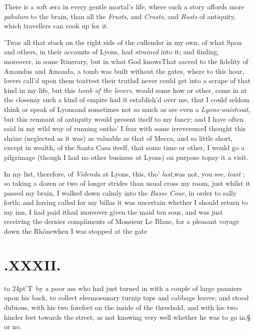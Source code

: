 \documentclass{article}
\begin{document}
There is a soft æra in every gentle mortal’s life,
where such a story affords more \textit{pabulum} to the brain, than
all the \textit{Frusts}, and \textit{Crusts}, and \textit{Rusts} of
antiquity, which travellers can cook up for it.

\tsh ’Twas all that stuck on the right\break
side of the cullender in my own, of what Spon
and others, in their accounts of Lyons, had \textit{strained} into it; and finding,
moreover, in some Itinerary, but in what God knows\tsk That sacred to the fidelity
of Amandus and Amanda, a tomb was built without the gates, where to this hour,
lovers call’d upon them to\pb attest their truths\tsk I never could get into a scrape
of that kind in my life, but this \textit{tomb of the lovers}, would some how or
other, come in at the close\tsk nay such a kind of empire had it establish’d over me,
that I could seldom think or speak of Lyons\tsk and sometimes not so much as see even
a \textit{Lyons-waistcoat}, but this remnant of antiquity would present itself to my
fancy; and I have often said in my wild way of running on\tsk tho’ I fear with some
irreverence\tsk \lqq I thought this shrine (neglected as it was) as valuable as that of
Mecca, and so little short, except in wealth, of the Santa Casa itself, that some
time or other, I would go a pilgrimage (though I had no other business at Lyons) on
purpose to\break pay it a visit.

\newpage
In my list, therefore, of \textit{Videnda} at Lyons, this, tho’ \textit{last},\tsk was
not, you see, \textit{least} ; so taking a dozen or two of longer strides than usual
cross my room, just whilst it passed my brain, I walked down calmly into the
\textit{Basse Cour}, in order to sally forth; and having called for my bill\tsk as it
was uncertain whether I should return to my inn, I had paid it\tsh had moreover
given the maid ten sous, and was just receiving the dernier compliments of Monsieur
Le Blanc, for a pleasant voyage down the Rhône\tsh when I was stopped at the gate
\tsh

\newpage
\section{.\enspace XXXII.}

\lettrine{\hbox to 24pt{\Tsk}\lower-10pt\hbox{\large’}T}{\,} by a poor ass who had\break
just turned in with a couple\break
of large panniers upon his back, to collect eleemosunary turnip
tops and cabbage leaves; and stood dubious, with his two
forefeet on the inside of the threshold, and with his two
hinder feet towards the street, as not knowing very well whether
he was to go in,§ or no.
\end{document}
